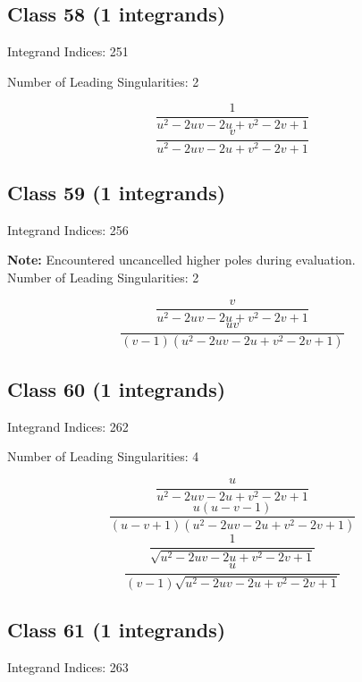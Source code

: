 \documentclass[11pt,a4paper]{article}
\begin{document}
\subsection*{Class 58 (1 integrands)}
Integrand Indices: 251

Number of Leading Singularities: 2

\begin{equation}
\frac{1}{u^2-2 u v-2 u+v^2-2 v+1}
\end{equation}
\begin{equation}
\frac{v}{u^2-2 u v-2 u+v^2-2 v+1}
\end{equation}


\subsection*{Class 59 (1 integrands)}
Integrand Indices: 256

\textbf{Note:} Encountered uncancelled higher poles during evaluation.\\[1em]

Number of Leading Singularities: 2

\begin{equation}
\frac{v}{u^2-2 u v-2 u+v^2-2 v+1}
\end{equation}
\begin{equation}
\frac{u v}{(v-1) \left(u^2-2 u v-2 u+v^2-2 v+1\right)}
\end{equation}


\subsection*{Class 60 (1 integrands)}
Integrand Indices: 262

Number of Leading Singularities: 4

\begin{equation}
\frac{u}{u^2-2 u v-2 u+v^2-2 v+1}
\end{equation}
\begin{equation}
\frac{u (u-v-1)}{(u-v+1) \left(u^2-2 u v-2 u+v^2-2 v+1\right)}
\end{equation}
\begin{equation}
\frac{1}{\sqrt{u^2-2 u v-2 u+v^2-2 v+1}}
\end{equation}
\begin{equation}
\frac{u}{(v-1) \sqrt{u^2-2 u v-2 u+v^2-2 v+1}}
\end{equation}


\subsection*{Class 61 (1 integrands)}
Integrand Indices: 263
\end{document}
